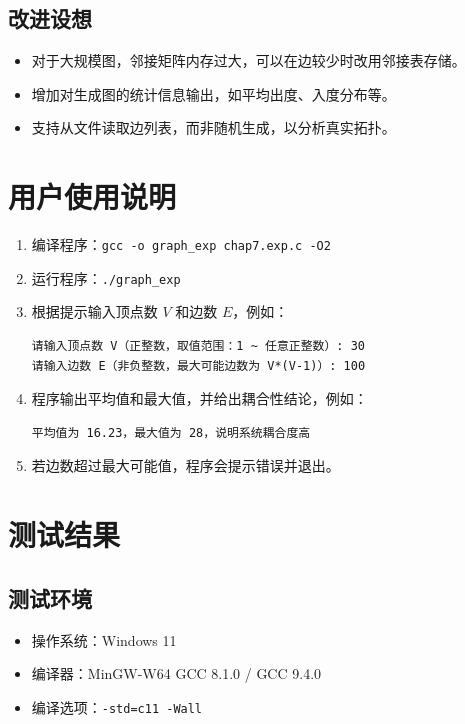 \documentclass[UTF8]{ctexart}
\begin{document}
\subsection{改进设想}
\begin{itemize}
    \item 对于大规模图，邻接矩阵内存过大，可以在边较少时改用邻接表存储。
    \item 增加对生成图的统计信息输出，如平均出度、入度分布等。
    \item 支持从文件读取边列表，而非随机生成，以分析真实拓扑。
\end{itemize}

\section{用户使用说明}

\begin{enumerate}
    \item 编译程序：\texttt{gcc -o graph\_exp chap7.exp.c -O2}
    \item 运行程序：\texttt{./graph\_exp}
    \item 根据提示输入顶点数 \(V\) 和边数 \(E\)，例如：
\begin{verbatim}
请输入顶点数 V（正整数，取值范围：1 ~ 任意正整数）: 30
请输入边数 E（非负整数，最大可能边数为 V*(V-1)）: 100
\end{verbatim}
    \item 程序输出平均值和最大值，并给出耦合性结论，例如：
\begin{verbatim}
平均值为 16.23，最大值为 28，说明系统耦合度高
\end{verbatim}
    \item 若边数超过最大可能值，程序会提示错误并退出。
\end{enumerate}

\section{测试结果}

\subsection{测试环境}
\begin{itemize}
    \item 操作系统：Windows 11
    \item 编译器：MinGW-W64 GCC 8.1.0 / GCC 9.4.0
    \item 编译选项：\texttt{-std=c11 -Wall}
\end{itemize}
\end{document}
